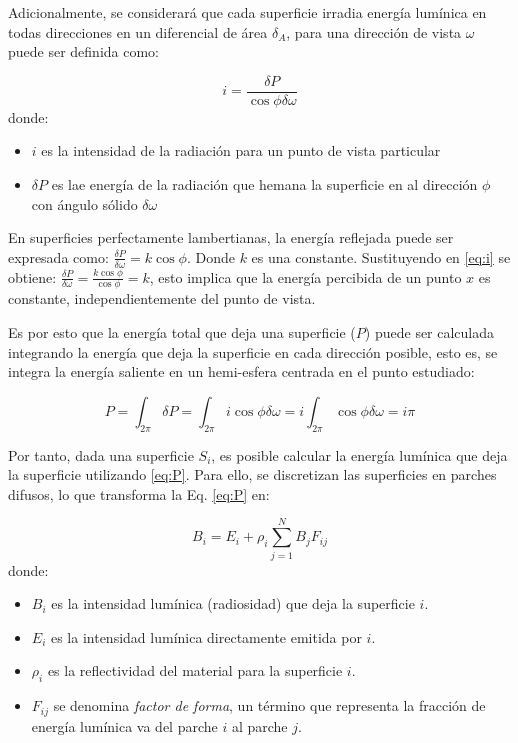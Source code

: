 Adicionalmente, se considerará que cada superficie irradia energía lumínica en todas direcciones en un diferencial de área $\delta_{A}$, para una dirección de vista $\omega$ puede ser definida como:

\begin{equation}
    i = \frac{\delta{P}}{\cos{\phi\delta\omega}} \label{eq:i}
\end{equation}
donde:
\begin{itemize}
    \item $i$ es la intensidad de la radiación para un punto de vista particular
    \item $\delta{P}$ es lae energía de la radiación que hemana la superficie en al dirección $\phi$ con ángulo sólido $\delta\omega$
\end{itemize}

En superficies perfectamente lambertianas, la energía reflejada puede ser expresada como: $\frac{\delta{P}}{\delta{\omega}} = k\cos{\phi}$. Donde $k$ es una constante.
Sustituyendo en \eqref{eq:i} se obtiene: $\frac{\delta{P}}{\delta{\omega}} = \frac{k\cos{\phi}}{\cos{\phi}} = k$, esto implica que la energía percibida de un punto $x$ 
es constante, independientemente del punto de vista.

Es por esto que la energía total que deja una superficie ($P$) puede ser calculada integrando la energía que deja la superficie en cada dirección posible, esto es, se integra la energía saliente en un hemi-esfera centrada en el punto estudiado:

\begin{equation}
    P = \int_{2\pi} \delta{P} = \int_{2\pi} i\cos{\phi}\delta{\omega} = i \int_{2\pi} \cos{\phi}\delta{\omega} = i\pi
    \label{eq:P}
\end{equation}

Por tanto, dada una superficie $S_{i}$, es posible calcular la energía lumínica que deja la superficie utilizando \eqref{eq:P}. Para ello, se discretizan las superficies en parches difusos, lo que transforma la Eq. \eqref{eq:P} en:

\begin{equation}
    B_{i} = E_{i} + \rho_{i} \sum_{j=1}^{N} B_{j} F_{ij} \label{eq:radiosity}
\end{equation}
donde:
\begin{itemize}
    \item $B_{i}$ es la intensidad lumínica (radiosidad) que deja la superficie $i$.
    \item $E_{i}$ es la intensidad lumínica directamente emitida por $i$.
    \item $\rho_{i}$ es la reflectividad del material para la superficie $i$.
    \item $F_{ij}$ se denomina \textit{factor de forma}, un término que representa la fracción de energía lumínica va del parche $i$ al parche $j$. 
\end{itemize}

